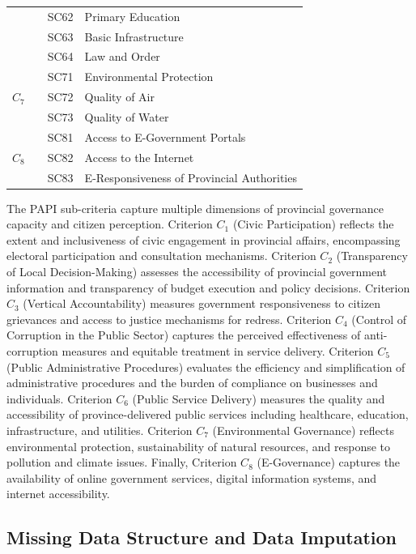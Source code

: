 \documentclass[12pt,a4paper]{article}
\begin{document}
\begin{table}[!ht]
\begin{tabular}{c >{\centering\arraybackslash}m{3.6cm} c l}
 & & SC62 & Primary Education \\
 & & SC63 & Basic Infrastructure \\
 & & SC64 & Law and Order \\
\midrule
\multirow{3}{*}{$C_7$} & \multirow{3}{3.6cm}{\centering Environmental Governance} & SC71 & Environmental Protection \\
 & & SC72 & Quality of Air \\
 & & SC73 & Quality of Water \\
\midrule
\multirow{3}{*}{$C_8$} & \multirow{3}{3.6cm}{\centering E-Governance} & SC81 & Access to E-Government Portals \\
 & & SC82 & Access to the Internet \\
 & & SC83 & E-Responsiveness of Provincial Authorities \\
\bottomrule
\end{tabular}
\end{table}

\FloatBarrier

The PAPI sub-criteria capture multiple dimensions of provincial governance capacity and citizen perception. Criterion $C_1$ (Civic Participation) reflects the extent and inclusiveness of civic engagement in provincial affairs, encompassing electoral participation and consultation mechanisms. Criterion $C_2$ (Transparency of Local Decision-Making) assesses the accessibility of provincial government information and transparency of budget execution and policy decisions. Criterion $C_3$ (Vertical Accountability) measures government responsiveness to citizen grievances and access to justice mechanisms for redress. Criterion $C_4$ (Control of Corruption in the Public Sector) captures the perceived effectiveness of anti-corruption measures and equitable treatment in service delivery. Criterion $C_5$ (Public Administrative Procedures) evaluates the efficiency and simplification of administrative procedures and the burden of compliance on businesses and individuals. Criterion $C_6$ (Public Service Delivery) measures the quality and accessibility of province-delivered public services including healthcare, education, infrastructure, and utilities. Criterion $C_7$ (Environmental Governance) reflects environmental protection, sustainability of natural resources, and response to pollution and climate issues. Finally, Criterion $C_8$ (E-Governance) captures the availability of online government services, digital information systems, and internet accessibility.

\subsection{Missing Data Structure and Data Imputation}
\label{subsec:missing}
\end{document}

